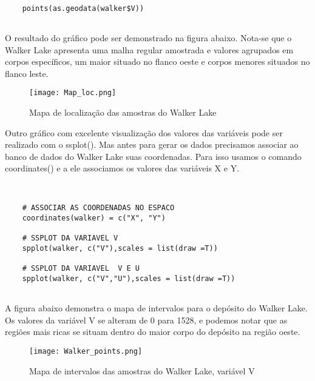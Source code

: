 \begin{scriptsize}
	\estiloR
	\begin{lstlisting}[caption={Criação de um vetor em R}, label=lst:rcode]
	
	points(as.geodata(walker$V))
	
	\end{lstlisting}
\end{scriptsize}

O resultado do gráfico pode ser demonstrado na figura abaixo. Nota-se que o Walker Lake apresenta uma malha regular amostrada e valores agrupados em corpos específicos, um maior situado no flanco oeste e corpos menores situados no flanco leste.

\FloatBarrier
 \begin{figure}[H]
	\centering
	\texttt{[image: Map\_loc.png]}	
	\caption{Mapa de localização das amostras do Walker Lake}
	\label{walk}
\end{figure}
\FloatBarrier

Outro gráfico com excelente visualização dos valores das variáveis pode ser realizado com o ssplot(). Mas antes para gerar os dados precisamos associar ao banco de dados do Walker Lake suas coordenadas. Para isso usamos o comando coordinates() e a ele associamos os valores das variáveis X e Y.


\begin{scriptsize}
	\estiloR
	\begin{lstlisting}[caption={Criação de um vetor em R}, label=lst:rcode]
	
	
	# ASSOCIAR AS COORDENADAS NO ESPACO
	coordinates(walker) = c("X", "Y")
	
	# SSPLOT DA VARIAVEL V 
	spplot(walker, c("V"),scales = list(draw =T))
	
	# SSPLOT DA VARIAVEL  V E U 
	spplot(walker, c("V","U"),scales = list(draw =T))
	
	\end{lstlisting}
\end{scriptsize}

A figura abaixo demonstra o mapa de intervalos para o depósito do Walker Lake. Os valores da variável V se alteram de 0 para 1528, e podemos notar que as regiões mais ricas se situam dentro do maior corpo do depósito na região oeste.

\FloatBarrier
 \begin{figure}[H]
	\centering
	\texttt{[image: Walker\_points.png]}	
	\caption{Mapa de intervalos das amostras do Walker Lake, variável V}
	\label{walk}
\end{figure}
\FloatBarrier

